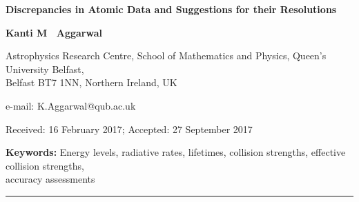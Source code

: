 \documentclass[fleqn]{article}
\begin{document}
\begin{flushleft}
{\LARGE
{\bf Discrepancies in Atomic Data and Suggestions for their Resolutions}
}\\

\vspace{1.5 cm}

{\bf {Kanti  M  ~Aggarwal}}\\ 

\vspace*{1.0cm}

Astrophysics Research Centre, School of Mathematics and Physics, Queen's University Belfast, \\Belfast BT7 1NN, Northern Ireland, UK\\ 
\vspace*{0.5 cm} 

e-mail: K.Aggarwal@qub.ac.uk \\

\vspace*{0.20cm}

Received: 16 February 2017; Accepted: 27 September 2017

\vspace*{1.0 cm}

{\bf Keywords:} Energy levels, radiative rates, lifetimes, collision strengths, effective collision strengths, \\accuracy assessments

\vspace*{1.0 cm}

\hrule

\vspace{0.5 cm}

\end{flushleft}

\clearpage


\end{document}
